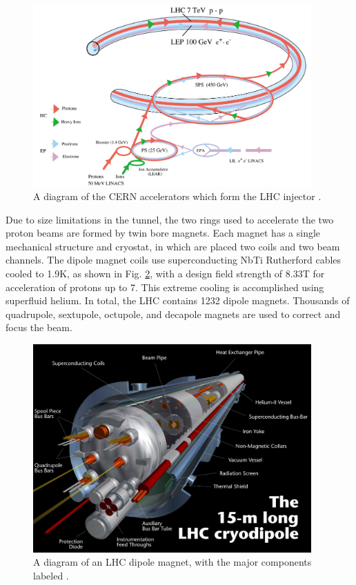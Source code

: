 \begin{figure}[hbt]
\begin{center}
\includegraphics[width=0.95\textwidth]{figures/lhc-pho-1993-008.png}
\caption{A diagram of the CERN accelerators which form the LHC injector \cite{Jean-Luc:841568}.}
\label{fig:lhc-injectors}
\end{center}
\end{figure}

Due to size limitations in the tunnel, the two rings used to accelerate the two proton beams are formed by twin bore magnets. Each magnet has a single mechanical structure and cryostat, in which are placed two coils and two beam channels. The dipole magnet coils use superconducting NbTi Rutherford cables cooled to 1.9\unit{K}, as shown in Fig. \ref{fig:lhc-dipole}, with a design field strength of 8.33\unit{T} for acceleration of protons up to 7\TeV. This extreme cooling is accomplished using superfluid helium. In total, the LHC contains 1232 dipole magnets. Thousands of quadrupole, sextupole, octupole, and decapole magnets are used to correct and focus the beam.

\begin{figure}[hbt]
\begin{center}
\includegraphics[width=0.95\textwidth]{figures/lhc-pho-1998-299.jpg}
\caption{A diagram of an LHC dipole magnet, with the major components labeled \cite{Dailler:842253}.}
\label{fig:lhc-dipole}
\end{center}
\end{figure}


